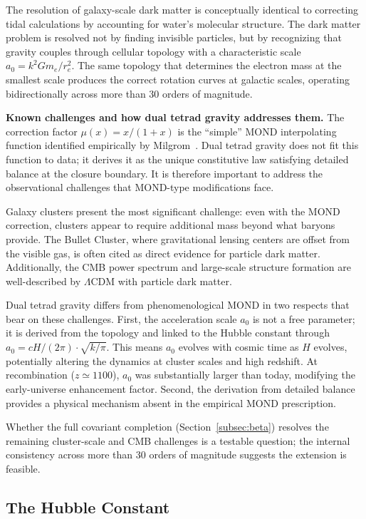 \documentclass[aps,prd,preprint,superscriptaddress,showpacs,preprintnumbers,amsmath,amssymb,nofootinbib]{revtex4-2}
\begin{document}
The resolution of galaxy-scale dark matter is conceptually identical to correcting tidal calculations by accounting for water's molecular structure. The dark matter problem is resolved not by finding invisible particles, but by recognizing that gravity couples through cellular topology with a characteristic scale $a_0 = k^2 G m_e / r_e^2$. The same topology that determines the electron mass at the smallest scale produces the correct rotation curves at galactic scales, operating bidirectionally across more than 30 orders of magnitude.

\textbf{Known challenges and how dual tetrad gravity addresses them.} The correction factor $\mu(x) = x/(1+x)$ is the ``simple'' MOND interpolating function identified empirically by Milgrom~\cite{milgrom1983}. Dual tetrad gravity does not fit this function to data; it derives it as the unique constitutive law satisfying detailed balance at the closure boundary. It is therefore important to address the observational challenges that MOND-type modifications face.

Galaxy clusters present the most significant challenge: even with the MOND correction, clusters appear to require additional mass beyond what baryons provide. The Bullet Cluster, where gravitational lensing centers are offset from the visible gas, is often cited as direct evidence for particle dark matter. Additionally, the CMB power spectrum and large-scale structure formation are well-described by $\Lambda$CDM with particle dark matter.

Dual tetrad gravity differs from phenomenological MOND in two respects that bear on these challenges. First, the acceleration scale $a_0$ is not a free parameter; it is derived from the topology and linked to the Hubble constant through $a_0 = cH/(2\pi) \cdot \sqrt{k/\pi}$. This means $a_0$ evolves with cosmic time as $H$ evolves, potentially altering the dynamics at cluster scales and high redshift. At recombination ($z \simeq 1100$), $a_0$ was substantially larger than today, modifying the early-universe enhancement factor. Second, the derivation from detailed balance provides a physical mechanism absent in the empirical MOND prescription.

Whether the full covariant completion (Section~\ref{subsec:beta}) resolves the remaining cluster-scale and CMB challenges is a testable question; the internal consistency across more than 30 orders of magnitude suggests the extension is feasible.

\subsection{The Hubble Constant}
\label{subsec:hubble}
\end{document}
